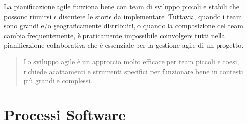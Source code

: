 \documentclass[10pt, letterpaper]{report}
\begin{document}
La pianificazione agile funziona bene con team di sviluppo piccoli e stabili che 
possono riunirsi e discutere le storie da implementare.
Tuttavia, quando i team sono grandi e/o geograficamente distribuiti, o quando
 la composizione del team cambia frequentemente, è praticamente impossibile coinvolgere
  tutti nella pianificazione collaborativa che è essenziale per la gestione agile di un progetto.
\begin{quote}
    Lo sviluppo agile è un approccio molto efficace per 
    team piccoli e coesi, richiede adattamenti e strumenti specifici 
    per funzionare bene in contesti più grandi e complessi.
\end{quote}
\chapter{Processi Software}
\end{document}
